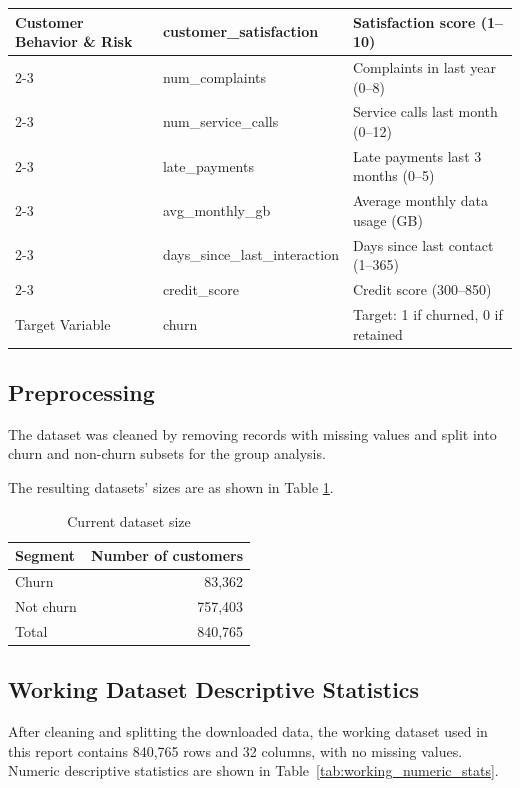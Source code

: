 \begin{table}[ht]
\begin{tabularx}{\textwidth}{|l|l|X|}
\multirow{9}{*}{Customer Behavior \& Risk}
& customer\_satisfaction & Satisfaction score (1--10) \\ \cline{2-3}
& num\_complaints & Complaints in last year (0--8) \\ \cline{2-3}
& num\_service\_calls & Service calls last month (0--12) \\ \cline{2-3}
& late\_payments & Late payments last 3 months (0--5) \\ \cline{2-3}
& avg\_monthly\_gb & Average monthly data usage (GB) \\ \cline{2-3}
& days\_since\_last\_interaction & Days since last contact (1--365) \\ \cline{2-3}
& credit\_score & Credit score (300--850) \\
\hline

\multirow{1}{*}{Target Variable}
& churn & Target: 1 if churned, 0 if retained \\
\hline

\end{tabularx}
\end{table}

\subsection{Preprocessing}
The dataset was cleaned by removing records with missing values and split into churn and non-churn subsets for the group analysis.

The resulting datasets' sizes are as shown in Table \ref{tab:dataset_size}.
\begin{table}[h]
\centering
\caption{Current dataset size}
\label{tab:dataset_size}
\begin{tabular}{lr}
\toprule
\textbf{Segment} & \textbf{Number of customers} \\
\midrule
Churn & 83,362 \\
Not churn & 757,403 \\
Total & 840,765 \\
\bottomrule
\end{tabular}
\end{table}

\subsection{Working Dataset Descriptive Statistics}
After cleaning and splitting the downloaded data, the working dataset used in
this report contains 840,765 rows and 32 columns, with no missing values. Numeric descriptive statistics are shown in
Table~\ref{tab:working_numeric_stats}.

